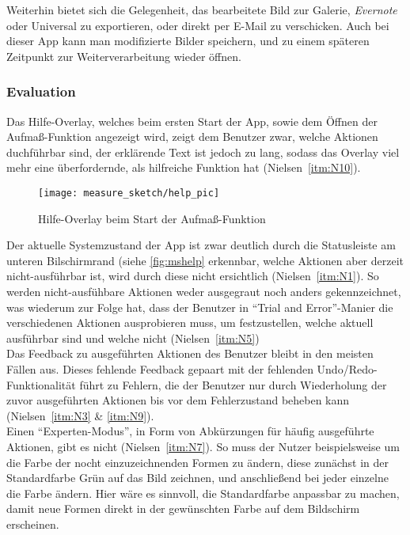Weiterhin bietet sich die Gelegenheit, das bearbeitete Bild zur Galerie, \emph{Evernote} oder Universal  zu exportieren, oder direkt per E-Mail zu verschicken.
Auch bei dieser App kann man modifizierte Bilder speichern, und zu einem späteren Zeitpunkt zur Weiterverarbeitung wieder öffnen. \\

\subsubsection{Evaluation}

Das Hilfe-Overlay, welches beim ersten Start der App, sowie dem Öffnen der Aufmaß-Funktion angezeigt wird, zeigt dem Benutzer zwar, welche Aktionen duchführbar sind, der erklärende Text ist jedoch zu lang, sodass das Overlay viel mehr eine überfordernde, als hilfreiche Funktion hat (Nielsen~\autoref{itm:N10}).

\begin{wrapfigure}{R}{0.5\textwidth}
  \texttt{[image: measure\_sketch/help\_pic]}
  \caption{Hilfe-Overlay beim Start der Aufmaß-Funktion}
  \label{fig:mshelp}
\end{wrapfigure}

Der aktuelle Systemzustand der App ist zwar deutlich durch die Statusleiste am unteren Bilschirmrand (siehe \autoref{fig:mshelp} erkennbar, welche Aktionen aber derzeit nicht-ausführbar ist, wird durch diese nicht ersichtlich (Nielsen~\autoref{itm:N1}). 
So werden nicht-ausfühbare Aktionen weder ausgegraut noch anders gekennzeichnet, was wiederum zur Folge hat, dass der Benutzer in ``Trial and Error''-Manier die verschiedenen Aktionen ausprobieren muss, um festzustellen, welche aktuell ausführbar sind und welche nicht (Nielsen~\autoref{itm:N5}) \\

Das Feedback zu ausgeführten Aktionen des Benutzer bleibt in den meisten Fällen aus.
Dieses fehlende Feedback gepaart mit der fehlenden Undo/Redo-Funktionalität führt zu Fehlern, die der Benutzer nur durch Wiederholung der zuvor ausgeführten Aktionen bis vor dem Fehlerzustand beheben kann (Nielsen~\autoref{itm:N3} \& \autoref{itm:N9}). \\

Einen ``Experten-Modus'', in Form von Abkürzungen für häufig ausgeführte Aktionen, gibt es nicht (Nielsen~\autoref{itm:N7}).
So muss der Nutzer beispielsweise um die Farbe der nocht einzuzeichnenden Formen zu ändern, diese zunächst in der Standardfarbe Grün auf das Bild zeichnen, und anschließend bei jeder einzelne die Farbe ändern.
Hier wäre es sinnvoll, die Standardfarbe anpassbar zu machen, damit neue Formen direkt in der gewünschten Farbe auf dem Bildschirm erscheinen. \\

